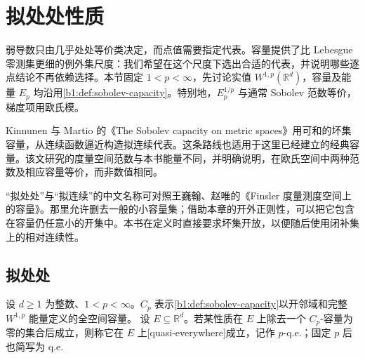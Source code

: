 \section{拟处处性质}
\label{b1:sec:2602}

弱导数只由几乎处处等价类决定，而点值需要指定代表。容量提供了比 Lebesgue 零测集更细的例外集尺度：我们希望在这个尺度下选出合适的代表，并说明哪些逐点结论不再依赖选择。本节固定 \(1<p<\infty\)，先讨论实值 \(W^{1,p}(\mathbb R^d)\)，容量及能量 \(E_p\) 均沿用\cref{b1:def:sobolev-capacity}。特别地，\(E_p^{1/p}\) 与通常 Sobolev 范数等价，梯度项用欧氏模。

\ProseParagraphBreak

Kinnunen 与 Martio 的《The Sobolev capacity on metric spaces》\cite[Section 3, 3.6. Theorem and 3.7. Corollary, p. 368]{KinnunenMartio1996Capacity}用可和的坏集容量，从连续函数逼近构造拟连续代表。这条路线也适用于这里已经建立的经典容量。该文研究的度量空间范数与本书能量不同，并明确说明，在欧氏空间中两种范数及相应容量等价，而非数值相同。

\ProseParagraphBreak

“拟处处”与“拟连续”的中文名称可对照王巍翰、赵唯的《Finsler 度量测度空间上的容量》\cite[定义4.4]{WangZhao2023Capacity}。那里允许删去一般的小容量集；借助本章的开外正则性，可以把它包含在容量仍任意小的开集中。本书在定义时直接要求坏集开放，以便随后使用闭补集上的相对连续性。


\subsection{拟处处}
\label{b1:subsec:260201}

\begin{definition}\label{b1:def:capacity-quasi-everywhere}
设 \(d\geq1\) 为整数、\(1<p<\infty\)。\(C_p\) 表示\cref{b1:def:sobolev-capacity}以开邻域和完整 \(W^{1,p}\) 能量定义的全空间容量。
设 \(E\subseteq\mathbb R^d\)。若某性质在 \(E\) 上除去一个 \(C_p\)-容量为零的集合后成立，则称它在 \(E\) 上[quasi-everywhere]成立，记作 \(p\)-q.e.；固定 \(p\) 后也简写为 q.e.
\end{definition}

